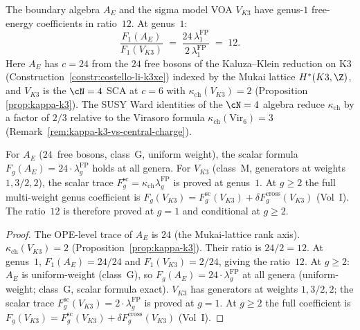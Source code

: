 \begin{proposition}
\label{prop:boundary-sigma-ratio}
The boundary algebra $A_E$ and the sigma model VOA
$V_{K3}$ have genus-$1$ free-energy coefficients in ratio~$12$.
At genus~$1$:
\begin{equation}\label{eq:boundary-sigma-ratio}
\frac{F_1(A_E)}{F_1(V_{K3})}
\;=\;
\frac{24\,\lambda_1^{\mathrm{FP}}}{2\,\lambda_1^{\mathrm{FP}}}
\;=\; 12.
\end{equation}
Here $A_E$ has $c = 24$ from the $24$ free bosons of the
Kaluza--Klein reduction on K3
\textup{(}Construction~\textup{\ref{constr:costello-li-k3xe})}
indexed by the Mukai lattice $H^*(K3, \Z)$, and
$V_{K3}$ is the $\cN = 4$ SCA at $c = 6$ with
$\kappa_{\mathrm{ch}}(V_{K3}) = 2$ \textup{(}Proposition~\textup{%
\ref{prop:kappa-k3})}. The SUSY Ward identities of the
$\cN = 4$ algebra reduce $\kappa_{\mathrm{ch}}$ by a factor of $2/3$
relative to the Virasoro formula $\kappa_{\mathrm{ch}}(\mathrm{Vir}_6) = 3$
\textup{(}Remark~\textup{\ref{rem:kappa-k3-vs-central-charge}}\textup{)}.

For $A_E$ \textup{(}$24$~free bosons, class~G,
uniform weight\textup{)}, the scalar formula
$F_g(A_E) = 24 \cdot \lambda_g^{\mathrm{FP}}$ holds at all
genera.
For $V_{K3}$ \textup{(}class~M, generators at weights
$1, 3/2, 2$\textup{)}, the scalar trace
$F_g^{\mathrm{sc}}=\kappa_{\mathrm{ch}}\lambda_g^{\mathrm{FP}}$ is proved at
genus~$1$.  At $g \geq 2$ the full multi-weight genus coefficient is
$F_g(V_{K3})=F_g^{\mathrm{sc}}(V_{K3})+\delta F_g^{\mathrm{cross}}(V_{K3})$
\textup{(Vol~I)}. The ratio~$12$ is
therefore proved at $g = 1$ and conditional at $g \geq 2$.
\end{proposition}

\begin{proof}
The OPE-level trace of $A_E$ is $24$ (the Mukai-lattice rank axis).
$\kappa_{\mathrm{ch}}(V_{K3}) = 2$ (Proposition~\ref{prop:kappa-k3}).
Their ratio is $24/2 = 12$. At genus~$1$,
$F_1(A_E)=24/24$ and $F_1(V_{K3})=2/24$, giving the ratio~$12$.
At $g \geq 2$: $A_E$ is uniform-weight (class~G),
so $F_g(A_E) = 24 \cdot \lambda_g^{\mathrm{FP}}$ at all genera
(uniform-weight; class~G, scalar formula exact).
$V_{K3}$ has generators at weights $1, 3/2, 2$; the scalar
trace $F_g^{\mathrm{sc}}(V_{K3}) = 2 \cdot \lambda_g^{\mathrm{FP}}$ is proved at
$g = 1$.  At $g \geq 2$ the full coefficient is
$F_g(V_{K3})=F_g^{\mathrm{sc}}(V_{K3})+\delta F_g^{\mathrm{cross}}(V_{K3})$
\textup{(Vol~I)}.
\end{proof}

